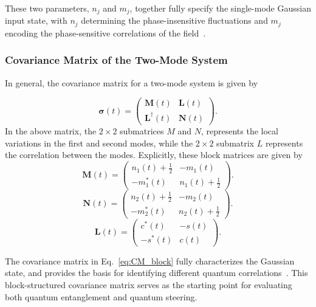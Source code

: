 These two parameters, \(n_j\) and \(m_j\), together fully specify the single-mode Gaussian input
state, with \(n_j\) determining the phase-insensitive fluctuations and \(m_j\) encoding the
phase-sensitive correlations of the field~\cite{Rong2006}.




\subsubsection{Covariance Matrix of the Two-Mode System}

In general, the covariance matrix for a two-mode system is given by

\begin{equation}
	\boldsymbol{\sigma}(t)=
	\begin{pmatrix}
		\mathbf{M}(t) & \mathbf{L}(t)\\
		\mathbf{L}^\dagger(t) & \mathbf{N}(t)
	\end{pmatrix}.
	\label{eq:CM_block}
\end{equation}
In the above matrix, the $2 \times 2$ submatrices $M$ and $N$, represents the local variations in the first and second modes, while the $2 \times 2$ submatrix $L$ represents the correlation between the modes.
Explicitly, these block matrices are given by
\begin{equation}
	\mathbf{M}(t)=
	\begin{pmatrix}
		n_1(t)+\tfrac12 & -m_1(t) \\
		-m_1^*(t) & n_1(t)+\tfrac12
	\end{pmatrix}.
	\label{eq:M_block}
\end{equation}
\begin{equation}
	\mathbf{N}(t)=
	\begin{pmatrix}
		n_2(t)+\tfrac12 & -m_2(t) \\
		-m_2^*(t) & n_2(t)+\tfrac12
	\end{pmatrix}.
	\label{eq:N_block}
\end{equation}
\begin{equation}
	\mathbf{L}(t)=
	\begin{pmatrix}
		c^*(t) & -s(t) \\
		-s^*(t) & c(t)
	\end{pmatrix}.
	\label{eq:L_block}
\end{equation}

The covariance matrix in Eq.~\eqref{eq:CM_block} fully characterizes the Gaussian state, and provides the basis for identifying different quantum correlations~\cite{Serafini2017,Weedbrook2012,AdessoRagyLee2014}.
This block-structured covariance matrix serves as the starting point for evaluating both
quantum entanglement and quantum steering.

